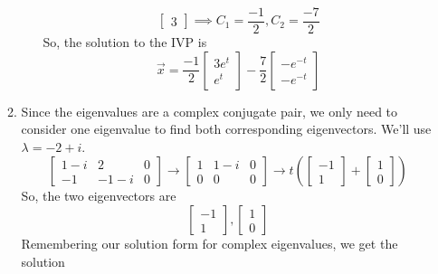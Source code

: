 \begin{enumerate}[label=\arabic*.]
\begin{enumerate}[label=(\alph*)]
\begin{enumerate}[label=(\roman*)]
\begin{equation*}
\begin{bmatrix}
									3
								\end{bmatrix} \implies C_1 = \frac{-1}{2}, C_2 = \frac{-7}{2}
							\end{equation*}
							So, the solution to the IVP is
							\begin{equation*}
								\vec{x} = \frac{-1}{2} \begin{bmatrix}
									3e^t \\
									e^t
								\end{bmatrix} - \frac{7}{2} \begin{bmatrix}
									-e^{-t} \\
									-e^{-t}
								\end{bmatrix} 
							\end{equation*}
					\end{enumerate}
				\item
					Since the eigenvalues are a complex conjugate pair, we only need to consider one eigenvalue to find both corresponding eigenvectors. We'll use $\lambda = -2 + i$.
					\begin{equation*}
						\left[
							\begin{array}{cc|c}
								1-i & 2 & 0 \\
								-1 & -1-i & 0
							\end{array}
						\right] \to \left[
							\begin{array}{cc|c}
								1 & 1-i & 0 \\
								0 & 0 & 0
							\end{array}
						\right] \to t\left(\begin{bmatrix}
							-1 \\
							1
						\end{bmatrix} + \begin{bmatrix}
							1 \\
							0
						\end{bmatrix}\right)
					\end{equation*}
					So, the two eigenvectors are
					\begin{equation*}
						\begin{bmatrix}
						-1 \\
						1
						\end{bmatrix}, \begin{bmatrix}
						1 \\
						0
						\end{bmatrix}
					\end{equation*}
					Remembering our solution form for complex eigenvalues, we get the solution

\end{enumerate}
\end{enumerate}
